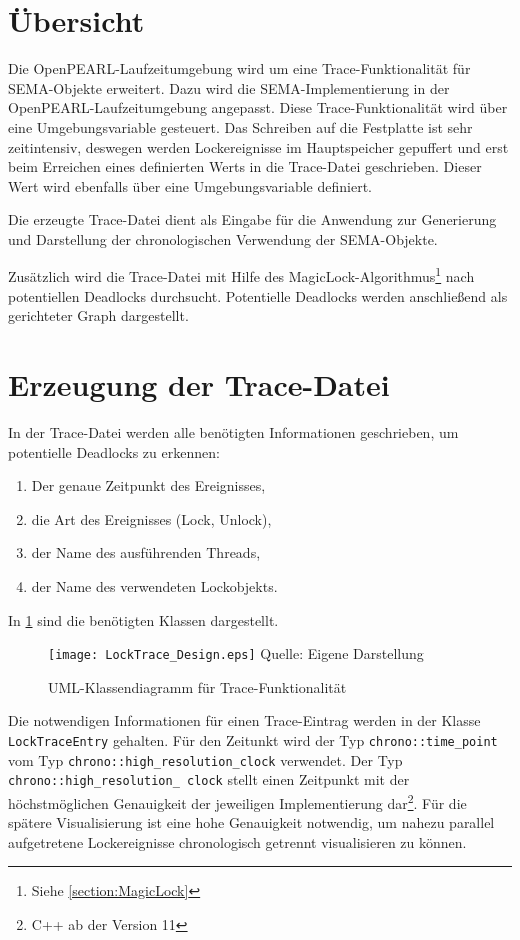 \section{Übersicht}
\label{section:Übersicht}
Die OpenPEARL-Laufzeitumgebung wird um eine Trace-Funktionalität für
\textrm{SEMA}-Objekte erweitert. Dazu wird die \textrm{SEMA}-Implementierung in
der OpenPEARL-Laufzeitumgebung angepasst. Diese Trace-Funktionalität wird über
eine Umgebungsvariable gesteuert. Das Schreiben auf die Festplatte ist sehr
zeitintensiv, deswegen werden Lockereignisse im Hauptspeicher gepuffert und erst
beim Erreichen eines definierten Werts in die Trace-Datei geschrieben. Dieser
Wert wird ebenfalls über eine Umgebungsvariable definiert.

Die erzeugte Trace-Datei dient als Eingabe für die Anwendung zur Generierung und
Darstellung der chronologischen Verwendung der \textrm{SEMA}-Objekte.

Zusätzlich wird die Trace-Datei mit Hilfe des
MagicLock-Algorithmus\footnote{Siehe \cref{section:MagicLock}} nach potentiellen
Deadlocks durchsucht. Potentielle Deadlocks werden anschließend als gerichteter
Graph dargestellt.

\section{Erzeugung der Trace-Datei}
\label{section:Erzeugung der Trace-Datei}
In der Trace-Datei werden alle benötigten Informationen geschrieben, um
potentielle Deadlocks zu erkennen:
\begin{enumerate}
  \item Der genaue Zeitpunkt des Ereignisses,
  \item die Art des Ereignisses (Lock, Unlock),
  \item der Name des ausführenden Threads,
  \item der Name des verwendeten Lockobjekts.
\end{enumerate}

In \cref{fig:LockTrace_Design} sind die benötigten Klassen dargestellt.
\begin{figure}[ht]
  \texttt{[image: LockTrace\_Design.eps]}
  \footnotesize\sffamily Quelle: Eigene Darstellung
  \caption{UML-Klassendiagramm für Trace-Funktionalität}
  \label{fig:LockTrace_Design}
\end{figure}
Die notwendigen Informationen für einen Trace-Eintrag werden in der Klasse
\texttt{Lock\-Trace\-Entry} gehalten. Für den Zeitunkt wird der Typ 
\texttt{chrono::\-time\_point} vom Typ \texttt{chrono::\-high\_\allowbreak resolution\_\allowbreak clock}
verwendet. Der Typ \texttt{chrono::\-high\_\allowbreak resolution\_\allowbreak
clock} stellt einen Zeitpunkt mit der höchstmöglichen Genauigkeit der jeweiligen
Implementierung dar\footnote{C++ ab der Version 11}. Für die spätere
Visualisierung ist eine hohe Genauigkeit notwendig, um nahezu parallel
aufgetretene Lockereignisse chronologisch getrennt visualisieren zu können.

